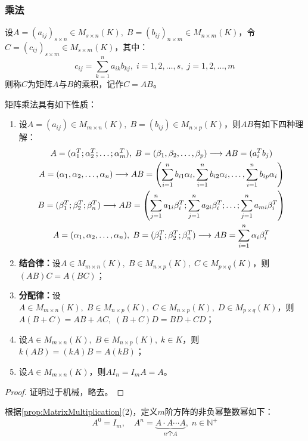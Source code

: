 \subsubsection{乘法}
\begin{definition}
	设$A=(a_{ij})_{s\times n}\in M_{s\times n}(K),\;B=(b_{ij})_{n\times m}\in M_{n\times m}(K)$，令$C=(c_{ij})_{s\times m}\in M_{s\times m}(K)$，其中：
	\begin{equation*}
		c_{ij}=\sum_{k=1}^{n}a_{ik}b_{kj},\;i=1,2,\dots,s,\;j=1,2,\dots,m
	\end{equation*}
	则称$C$为矩阵$A$与$B$的乘积，记作$C=AB$。
\end{definition}
\begin{property}\label{prop:MatrixMultiplication}
	矩阵乘法具有如下性质：
	\begin{enumerate}
		\item 设$A=(a_{ij})\in M_{m\times n}(K),\;B=(b_{ij})\in M_{n\times p}(K)$，则$AB$有如下四种理解：
		\begin{gather*}
			A=(\alpha_1^T;\alpha_2^T;\dots;\alpha_m^T),\;B=(\beta_1, \beta_2, \dots, \beta_{p})\longrightarrow AB=(a_i^Tb_j) \\
			A=(\alpha_1, \alpha_2, \dots, \alpha_{n})\longrightarrow AB=\left(\sum_{i=1}^{n}b_{i1}\alpha_i,\sum_{i=1}^{n}b_{i2}\alpha_i,\dots,\sum_{i=1}^{n}b_{ip}\alpha_i\right) \\
			B=(\beta_1^T;\beta_2^T;\beta_n^T)\longrightarrow AB=\left(\sum_{j=1}^{n}a_{1i}\beta_i^T;\sum_{j=1}^{n}a_{2i}\beta_i^T;\dots;\sum_{j=1}^{n}a_{mi}\beta_i^T\right) \\
			A=(\alpha_1, \alpha_2, \dots, \alpha_{n}),\;B=(\beta_1^T;\beta_2^T;\beta_n^T)\longrightarrow AB=\sum_{i=1}^{n}\alpha_i\beta_i^T
		\end{gather*}
		\item \textbf{结合律：}设$A\in M_{m\times n}(K),\;B\in M_{n\times p}(K),\;C\in M_{p\times q}(K)$，则$(AB)C=A(BC)$；
		\item \textbf{分配律：}设$A\in M_{m\times n}(K),\;B\in M_{n\times p}(K),\;C\in M_{n\times p}(K),\;D\in M_{p\times q}(K)$，则$A(B+C)=AB+AC,\;(B+C)D=BD+CD$；
		\item 设$A\in M_{m\times n}(K),\;B\in M_{n\times p}(K),\;k\in K$，则$k(AB)=(kA)B=A(kB)$；
		\item 设$A\in M_{m\times n}(K)$，则$AI_n=I_mA=A$。
	\end{enumerate}
\end{property}
\begin{proof}
	证明过于机械，略去。
\end{proof}
\begin{definition}
	根据\cref{prop:MatrixMultiplication}(2)，定义$m$阶方阵的非负幂整数幂如下：
	\begin{equation*}
		A^0=I_m,\quad A^n=\underbrace{A\cdot A \cdots A}_{n\text{个}A},\;n\in\mathbb{N}^+
	\end{equation*}
\end{definition}
